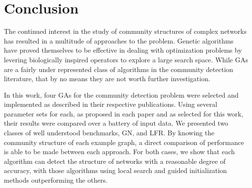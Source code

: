 \chapter{Conclusion}
\label{ch:conclusion}

The continued interest in the study of community structures of complex networks has resulted in a multitude of approaches to the problem. Genetic algorithms have proved themselves to be effective in dealing with optimization problems by levering biologically inspired operators to explore a large search space. While GAs are a fairly under represented class of algorithms in the community detection literature, that by no means they are not worth further investigation.

In this work, four GAs for the community detection problem were selected and implemented as described in their respective publications. Using several parameter sets for each, as proposed in each paper and as selected for this work, their results were compared over a battery of input data.
We presented two classes of well understood benchmarks, GN, and LFR. By knowing the community structure of each example graph, a direct comparison of performance is able to be made between each approach. For both cases, we show that each algorithm can detect the structure of networks with a reasonable degree of accuracy, with those algorithms using local search and guided initialization methods outperforming the others.